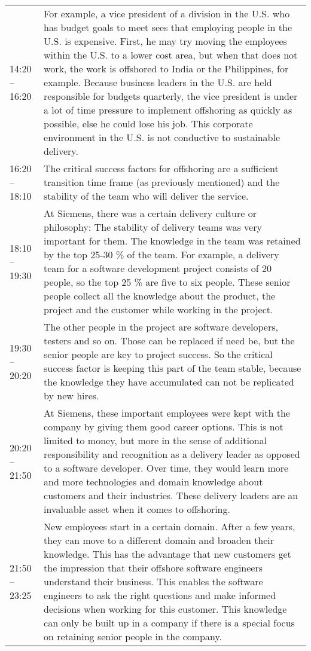 \begin{appendix}
\begin{longtable}{l p{12.5cm}}
	14:20 -- 16:20& For example, a vice president of a division in the U.S. who has budget goals to meet sees that employing people in the U.S. is expensive. First, he may try moving the employees within the U.S. to a lower cost area, but when that does not work, the work is offshored to India or the Philippines, for example. Because business leaders in the U.S. are held responsible for budgets quarterly, the vice president is under a lot of time pressure to implement offshoring as quickly as possible, else he could lose his job. This corporate environment in the U.S. is not conductive to sustainable delivery.\\
	16:20 -- 18:10&The critical success factors for offshoring are a sufficient transition time frame (as previously mentioned) and the stability of the team who will deliver the service.\\
	18:10 -- 19:30&At Siemens, there was a certain delivery culture or philosophy: The stability of delivery teams was very important for them. The knowledge in the team was retained by the top 25-30 \% of the team. For example, a delivery team for a software development project consists of 20 people, so the top 25 \% are five to six people. These senior people collect all the knowledge about the product, the project and the customer while working in the project.\\
	19:30 -- 20:20& The other people in the project are software developers, testers and so on. Those can be replaced if need be, but the senior people are key to project success. So the critical success factor is keeping this part of the team stable, because the knowledge they have accumulated can not be replicated by new hires.\\
	20:20 -- 21:50 & At Siemens, these important employees were kept with the company by giving them good career options. This is not limited to money, but more in the sense of additional responsibility and recognition as a delivery leader as opposed to a software developer. Over time, they would learn more and more technologies and domain knowledge about customers and their industries. These delivery leaders are an invaluable asset when it comes to offshoring.\\
	21:50 -- 23:25&New employees start in a certain domain. After a few years, they can move to a different domain and broaden their knowledge. This has the advantage that new customers get the impression that their offshore software engineers understand their business. This enables the software engineers to ask the right questions and make informed decisions when working for this customer. This knowledge can only be built up in a company if there is a special focus on retaining senior people in the company.\\

\end{longtable}
\end{appendix}

